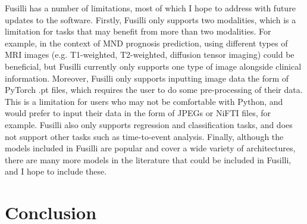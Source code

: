 Fusilli has a number of limitations, most of which I hope to address with future updates to the software.
Firstly, Fusilli only supports two modalities, which is a limitation for tasks that may benefit from more than two modalities.
For example, in the context of MND prognosis prediction, using different types of MRI images (e.g. T1-weighted, T2-weighted, diffusion tensor imaging) could be beneficial, but Fusilli currently only supports one type of image alongside clinical information.
Moreover, Fusilli only supports inputting image data the form of PyTorch .pt files, which requires the user to do some pre-processing of their data.
This is a limitation for users who may not be comfortable with Python, and would prefer to input their data in the form of JPEGs or NiFTI files, for example.
Fusilli also only supports regression and classification tasks, and does not support other tasks such as time-to-event analysis.
Finally, although the models included in Fusilli are popular and cover a wide variety of architectures, there are many more models in the literature that could be included in Fusilli, and I hope to include these.

\section{Conclusion}
